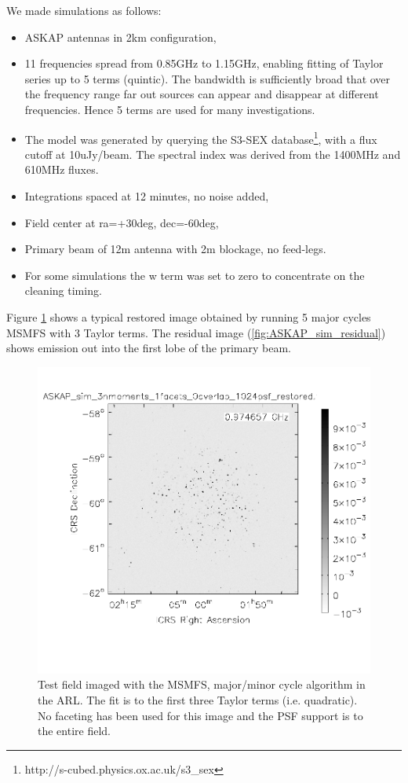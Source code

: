 \documentclass[11pt,a4paper,variablewidth]{article}
\begin{document}
We made simulations as follows:
\begin{itemize}
	\item ASKAP antennas in 2km configuration, 
	\item 11 frequencies spread from 0.85GHz to 1.15GHz, enabling fitting of  Taylor series up to 5 terms (quintic). The bandwidth is sufficiently broad that over the frequency range far out sources can appear and disappear at different frequencies. Hence 5 terms are used for many investigations.
	\item The model was generated by querying the S3-SEX database\footnote{http://s-cubed.physics.ox.ac.uk/s3\_sex}, with a flux cutoff at 10uJy/beam. The spectral index was derived from the 1400MHz and 610MHz fluxes.
	\item Integrations spaced at 12 minutes, no noise added,
	\item Field center at ra=+30deg, dec=-60deg,
	\item Primary beam of 12m antenna with 2m blockage, no feed-legs.
	\item For some simulations the w term was set to zero to concentrate on the cleaning timing.
\end{itemize}

Figure \ref{fig:ASKAP_sim_restored} shows a typical restored image obtained by running 5 major cycles MSMFS with 3 Taylor terms. The residual image (\ref{fig:ASKAP_sim_residual}) shows emission out into the first lobe of the primary beam.

\begin{figure}[H]
  \centering
  \includegraphics[width=\textwidth]{./ASKAP_sim_restored.png}
  \caption{Test field imaged with the MSMFS, major/minor cycle algorithm in the ARL. The fit is to the first three Taylor terms (i.e. quadratic). No faceting has been used for this image and the PSF support is to the entire field.}
  \label{fig:ASKAP_sim_restored}
\end{figure}
\end{document}
